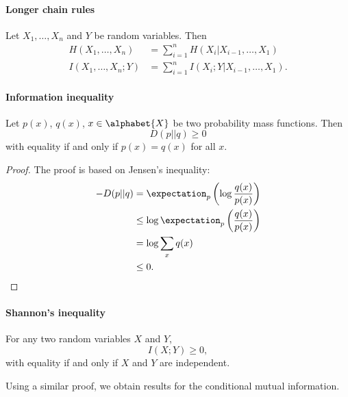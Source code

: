 \documentclass[a4paper, 11pt, openany]{book}
\begin{document}
\paragraph{Longer chain rules}

\begin{theorem}
Let $X_1,\ldots,X_n$ and $Y$ be random variables. Then
\begin{align*}
	H(X_1,\ldots,X_n) &= \sum_{i=1}^n H(X_i | X_{i-1}, \ldots, X_1)\\
	I(X_1,\ldots,X_n; Y) &= \sum_{i=1}^n I(X_i; Y | X_{i-1}, \ldots, X_1).
\end{align*}
\end{theorem}






\paragraph{Information inequality}

\begin{theorem}
Let $p(x)$, $q(x)$, $x \in \alphabet{X}$ be two probability mass functions. Then
\[
	D(p||q) \ge 0
\]
with equality if and only if $p(x) = q(x)$ for all $x$.
\end{theorem}

\begin{proof}
The proof is based on Jensen's inequality:
\begin{align*}
	-D(p||q) &= \expectation_p \left( \log \frac{q(x)}{p(x)} \right)\\
	&\le \log \expectation_p \left( \frac{q(x)}{p(x)} \right)\\
	&= \log \sum_x q(x)\\
	&\le 0.
\end{align*}
\end{proof}




\paragraph{Shannon's inequality}
\begin{corollary}
For any two random variables $X$ and $Y$,
\[
	I(X;Y) \ge 0,
\]
with equality if and only if $X$ and $Y$ are independent.
\end{corollary}

Using a similar proof, we obtain results for the conditional mutual information.
\end{document}
